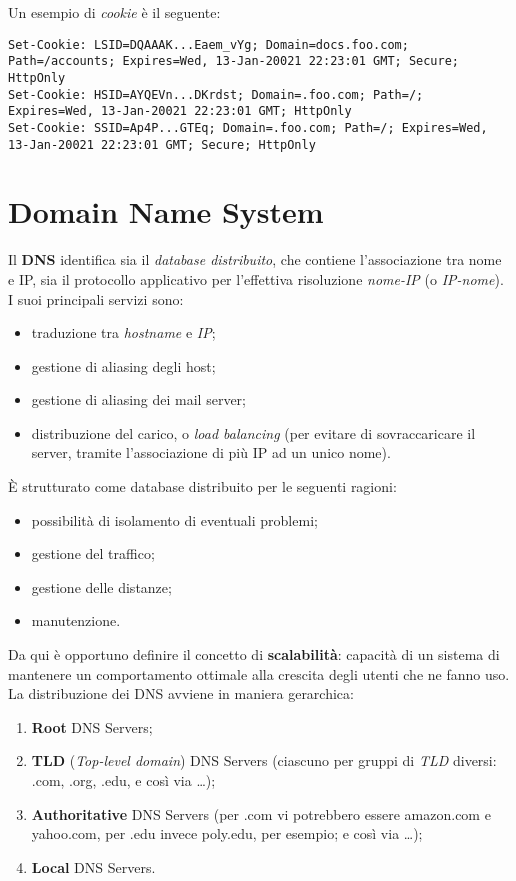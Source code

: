 Un esempio di \textit{cookie} è il seguente:
\begin{lstlisting}
Set-Cookie: LSID=DQAAAK...Eaem_vYg; Domain=docs.foo.com; Path=/accounts; Expires=Wed, 13-Jan-20021 22:23:01 GMT; Secure; HttpOnly
Set-Cookie: HSID=AYQEVn...DKrdst; Domain=.foo.com; Path=/; Expires=Wed, 13-Jan-20021 22:23:01 GMT; HttpOnly
Set-Cookie: SSID=Ap4P...GTEq; Domain=.foo.com; Path=/; Expires=Wed, 13-Jan-20021 22:23:01 GMT; Secure; HttpOnly
\end{lstlisting}

\section{Domain Name System}
Il \textbf{DNS} identifica sia il \textit{database distribuito}, che contiene l'associazione tra nome e IP, sia il protocollo applicativo per l'effettiva risoluzione \textit{nome-IP} (o \textit{IP-nome}). \\
I suoi principali servizi sono:
\begin{itemize}
	\item traduzione tra \textit{hostname} e \textit{IP};
	\item gestione di aliasing degli host;
	\item gestione di aliasing dei mail server;
	\item distribuzione del carico, o \textit{load balancing} (per evitare di sovraccaricare il server, tramite l'associazione di più IP ad un unico nome).
\end{itemize}
È strutturato come database distribuito per le seguenti ragioni:
\begin{itemize}
	\item possibilità di isolamento di eventuali problemi;
	\item gestione del traffico;
	\item gestione delle distanze;
	\item manutenzione.
\end{itemize}
Da qui è opportuno definire il concetto di \textbf{scalabilità}: capacità di un sistema di mantenere un comportamento ottimale alla crescita degli utenti che ne fanno uso. \\
La distribuzione dei DNS avviene in maniera gerarchica:
\begin{enumerate}
    \item \textbf{Root} DNS Servers;
    \item \textbf{TLD} (\textit{Top-level domain}) DNS Servers (ciascuno per gruppi di \textit{TLD} diversi: .com, .org, .edu, e così via \ldots);
    \item \textbf{Authoritative} DNS Servers (per .com vi potrebbero essere amazon.com e yahoo.com, per .edu invece poly.edu, per esempio; e così via \ldots);
    \item \textbf{Local} DNS Servers.
\end{enumerate}

